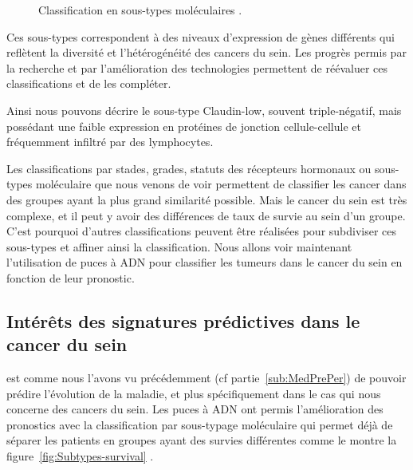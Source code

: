       \begin{figure}
        \centering
        \def\svgwidth{\columnwidth}
        
        \caption{Classification en sous-types moléculaires \citep{Perou2000,Sorlie2001}.}
        \label{fig:Subtypes}
      \end{figure}
      \pagebreak

      Ces sous-types correspondent à des niveaux d'expression de gènes différents qui reflètent la diversité et l'hétérogénéité des cancers du sein.
      Les progrès permis par la recherche et par l'amélioration des technologies permettent de réévaluer ces classifications et de les compléter.

      Ainsi nous pouvons décrire le sous-type Claudin-low, souvent triple-négatif, mais possédant une faible expression en protéines de jonction cellule-cellule et fréquemment infiltré par des lymphocytes.

      Les classifications par stades, grades, statuts des récepteurs hormonaux ou sous-types moléculaire que nous venons de voir permettent de classifier les cancer dans des groupes ayant la plus grand similarité possible.
      Mais le cancer du sein est très complexe, et il peut y avoir des différences de taux de survie au sein d'un groupe.
      C'est pourquoi d'autres classifications peuvent être réalisées pour subdiviser ces sous-types et affiner ainsi la classification.
      Nous allons voir maintenant l'utilisation de puces à \acs{ADN} pour classifier les tumeurs dans le cancer du sein en fonction de leur pronostic.

    \subsection{\textcolor{myred}{Intérêts des signatures prédictives dans le cancer du sein}}

       est comme nous l'avons vu précédemment (cf partie~\ref{sub:MedPrePer}) de pouvoir prédire l'évolution de la maladie, et plus spécifiquement dans le cas qui nous concerne des cancers du sein. Les puces à \acs{ADN} ont permis l'amélioration des pronostics avec la classification par sous-typage moléculaire qui permet déjà de séparer les patients en groupes ayant des survies différentes comme le montre la figure~\ref{fig:Subtypes-survival} \citep{Perou2000,Sorlie2001,Hu2006}.

